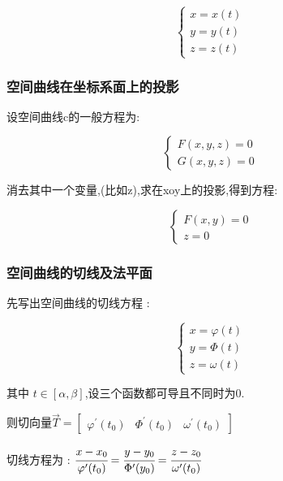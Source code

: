 \documentclass[UTF8,12pt]{ctexbook}
\newcommand{\derivative}{^\prime}
\begin{document}
{{{{\begin{enumerate}
{              $$
                \begin{cases}
                  x = x(t) \\
                  y = y(t) \\
                  z = z(t)
                \end{cases}
              $$
              }
      \end{enumerate}
    }%

    \subsubsection{空间曲线在坐标系面上的投影}{

      设空间曲线c的一般方程为:

      $$
        \begin{cases}
          F(x,y,z) = 0 \\
          G(x,y,z) = 0
        \end{cases}
      $$

      消去其中一个变量,(比如z),求在xoy上的投影,得到方程:

      $$
        \begin{cases}
          F(x,y) = 0 \\
          z = 0
        \end{cases}
      $$
    }%

    \subsubsection{空间曲线的切线及法平面}{
      先写出空间曲线的切线方程 :

      $$
        \begin{cases}
          x = \varphi(t) \\
          y = \Phi(t)    \\
          z = \omega(t)
        \end{cases}
      $$

      其中 $t \in [\alpha,\beta]$,设三个函数都可导且不同时为0.

      则切向量$\vec{T} = \begin{bmatrix}
          \varphi\derivative(t_0) & \Phi\derivative(t_0) & \omega\derivative(t_0)
        \end{bmatrix}$

      切线方程为 : $\cfrac{x - x_0}{\varphi\derivative(t_0)} = \cfrac{y - y_0}{\Phi\derivative(y_0)} = \cfrac{z - z_0}{\omega\derivative(t_0)}$

}}}}
\end{document}
